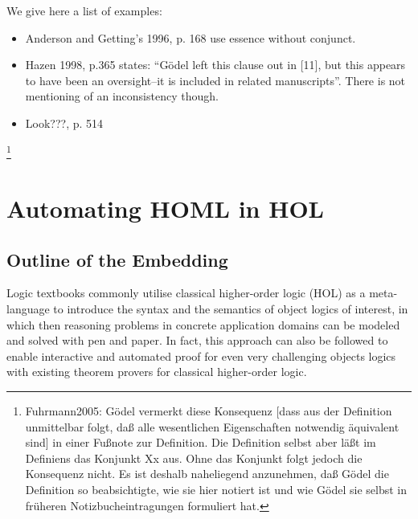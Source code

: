 \documentclass{article}
\begin{document}
We give here a list of examples:
\begin{itemize}
\item Anderson and Getting's 1996, p. 168 \cite[p.168]{AndersonGettings1968}
  use essence without conjunct.
\item  Hazen 1998, p.365 \cite[p.365]{Hazen1998} states: ``G\"odel left this
  clause out in [11], but this appears to have been an oversight--it
  is included in related manuscripts''. There is not mentioning of an
  inconsistency though.
\item Look???, p. 514

\end{itemize}


\footnote{Fuhrmann2005: Gödel vermerkt diese Konsequenz [dass aus der Definition unmittelbar folgt, daß alle wesentlichen
Eigenschaften notwendig äquivalent sind] in einer Fußnote zur Definition. Die Definition selbst aber läßt im Definiens das Konjunkt Xx aus. Ohne das Konjunkt folgt jedoch die Konsequenz nicht. Es ist deshalb naheliegend anzunehmen, daß Gödel die Definition so beabsichtigte, wie sie hier notiert ist und wie Gödel sie selbst in früheren Notizbucheintragungen formuliert hat.}





\section{Automating HOML in HOL}
\subsection{Outline of the Embedding}
Logic textbooks commonly utilise classical higher-order logic (HOL)
\cite{Church} as a meta-language to introduce the syntax and the
semantics of object logics of interest, in which then reasoning
problems in concrete application domains can be modeled and solved
with pen and paper.  In fact, this approach can also be followed to
enable interactive and automated proof for even very challenging
objects logics with existing theorem provers for classical
higher-order logic.
\end{document}
